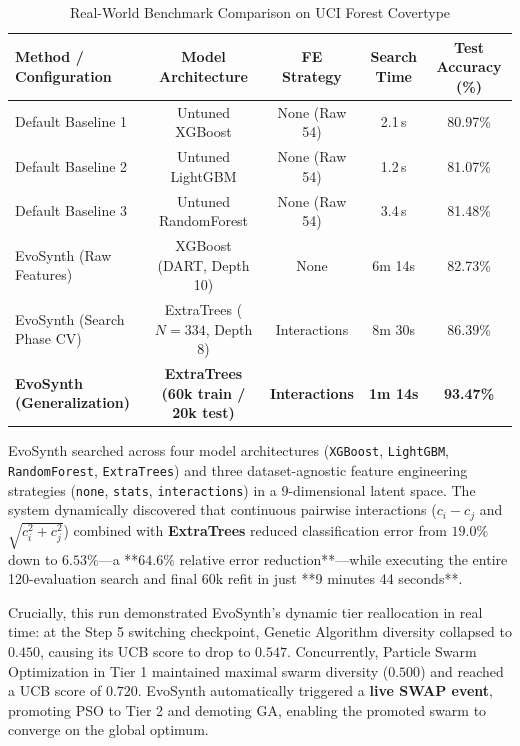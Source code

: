 \documentclass[conference]{IEEEtran}
\begin{document}
\begin{table}[htbp]
\caption{Real-World Benchmark Comparison on UCI Forest Covertype}
\label{tab:covtype}
\centering
\begin{tabular}{lcccc}
\toprule
\textbf{Method / Configuration} & \textbf{Model Architecture} & \textbf{FE Strategy} & \textbf{Search Time} & \textbf{Test Accuracy (\%)} \\
\midrule
Default Baseline 1 & Untuned XGBoost & None (Raw 54) & 2.1\,s & 80.97\% \\
Default Baseline 2 & Untuned LightGBM & None (Raw 54) & 1.2\,s & 81.07\% \\
Default Baseline 3 & Untuned RandomForest & None (Raw 54) & 3.4\,s & 81.48\% \\
\midrule
EvoSynth (Raw Features) & XGBoost (DART, Depth 10) & None & 6m 14s & 82.73\% \\
EvoSynth (Search Phase CV) & ExtraTrees ($N=334$, Depth 8) & Interactions & 8m 30s & 86.39\% \\
\textbf{EvoSynth (Generalization)} & \textbf{ExtraTrees (60k train / 20k test)} & \textbf{Interactions} & \textbf{1m 14s} & \textbf{93.47\%} \\
\bottomrule
\end{tabular}
\end{table}

EvoSynth searched across four model architectures (\texttt{XGBoost}, \texttt{LightGBM}, \texttt{RandomForest}, \texttt{ExtraTrees}) and three dataset-agnostic feature engineering strategies (\texttt{none}, \texttt{stats}, \texttt{interactions}) in a 9-dimensional latent space. The system dynamically discovered that continuous pairwise interactions ($c_i - c_j$ and $\sqrt{c_i^2 + c_j^2}$) combined with \textbf{ExtraTrees} reduced classification error from $19.0\%$ down to $6.53\%$---a **$64.6\%$ relative error reduction**---while executing the entire 120-evaluation search and final 60k refit in just **9 minutes 44 seconds**.

Crucially, this run demonstrated EvoSynth's dynamic tier reallocation in real time: at the Step 5 switching checkpoint, Genetic Algorithm diversity collapsed to $0.450$, causing its UCB score to drop to $0.547$. Concurrently, Particle Swarm Optimization in Tier 1 maintained maximal swarm diversity ($0.500$) and reached a UCB score of $0.720$. EvoSynth automatically triggered a \textbf{live SWAP event}, promoting PSO to Tier 2 and demoting GA, enabling the promoted swarm to converge on the global optimum.
\end{document}
